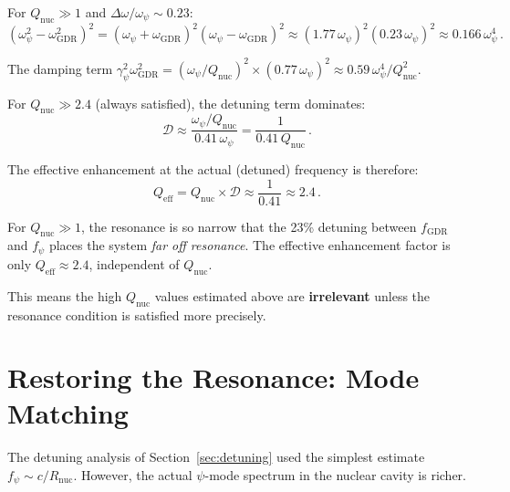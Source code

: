 \documentclass[aps,prd,twocolumn,superscriptaddress,nofootinbib]{revtex4-2}
\newcommand{\Qnuc}{Q_{\mathrm{nuc}}}
\newcommand{\wGDR}{\omega_{\mathrm{GDR}}}
\newcommand{\wpsi}{\omega_\psi}
\newcommand{\gpsi}{\gamma_\psi}
\newcommand{\Rnuc}{R_{\mathrm{nuc}}}
\newcommand{\fGDR}{f_{\mathrm{GDR}}}
\newcommand{\fpsi}{f_\psi}
\begin{document}
For $\Qnuc \gg 1$ and $\Delta\omega/\wpsi \sim 0.23$:
\begin{equation}
(\wpsi^2 - \wGDR^2)^2 = (\wpsi + \wGDR)^2(\wpsi - \wGDR)^2
\approx (1.77\,\wpsi)^2(0.23\,\wpsi)^2 \approx 0.166\,\wpsi^4\,.
\end{equation}

The damping term $\gpsi^2\wGDR^2 = (\wpsi/\Qnuc)^2 \times
(0.77\,\wpsi)^2 \approx 0.59\,\wpsi^4/\Qnuc^2$.

For $\Qnuc \gg 2.4$ (always satisfied), the detuning term dominates:
\begin{equation}
\mathcal{D} \approx \frac{\wpsi/\Qnuc}{0.41\,\wpsi}
= \frac{1}{0.41\,\Qnuc}\,.
\end{equation}

The effective enhancement at the actual (detuned) frequency is
therefore:
\begin{equation}\label{eq:eff-Q}
Q_{\mathrm{eff}} = \Qnuc \times \mathcal{D}
\approx \frac{1}{0.41} \approx 2.4\,.
\end{equation}

\begin{tcolorbox}[colback=red!5!white, colframe=red!50!black,
title=Detuning Kills Narrow Resonance]
For $\Qnuc \gg 1$, the resonance is so narrow that the 23\% detuning
between $\fGDR$ and $\fpsi$ places the system \emph{far off resonance}.
The effective enhancement factor is only $Q_{\mathrm{eff}} \approx 2.4$,
independent of $\Qnuc$.

This means the high $\Qnuc$ values estimated above are
\textbf{irrelevant} unless the resonance condition is satisfied
more precisely.
\end{tcolorbox}


\section{Restoring the Resonance: Mode Matching}
\label{sec:mode-matching}

The detuning analysis of Section~\ref{sec:detuning} used the
simplest estimate $\fpsi \sim c/\Rnuc$.  However, the actual
$\psi$-mode spectrum in the nuclear cavity is richer.

\end{document}
